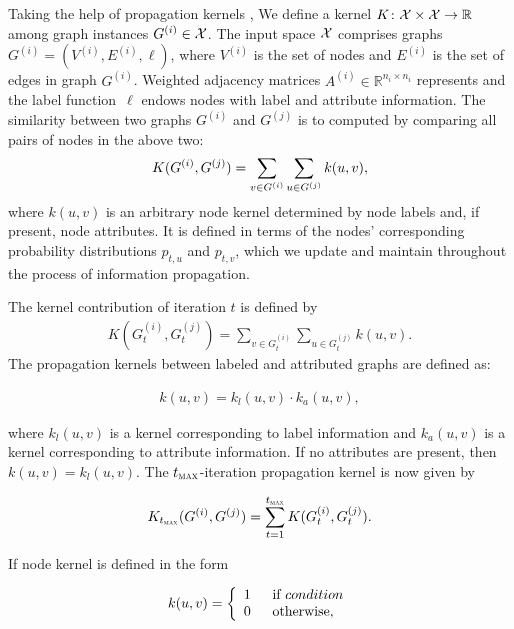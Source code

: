Taking the help of propagation kernels \citep{Neumann2015}, We define a kernel $K\colon \mathcal{X} \times \mathcal{X} \to \mathbb{R}$ 
among graph instances $G^{(i)} \in \mathcal{X} $. The input space $\mathcal{X}$ comprises graphs $G^{(i)} = (V^{(i)},E^{(i)},\ell)$, where $V^{(i)}$ is the set of nodes and $E^{(i)}$ is the set of edges in graph $G^{(i)}$. Weighted adjacency matrices $A^{(i)} \in \mathbb{R}^{n_i \times n_i}$ represents and the label function~$\ell$ endows nodes with label and attribute information.
The similarity between two graphs $G^{(i)}$ and $G^{(j)}$ is to computed by comparing all pairs of nodes in the above two:
\begin{align}
 K(G^{(i)}, G^{(j)}) =  \sum_{v \in G^{(i)}} \sum_{u \in G^{(j)}} k(u,v),  \notag
\end{align}
where $k(u,v)$ is an arbitrary node kernel determined by node labels
and, if present, node attributes. It is defined in terms of the nodes' corresponding probability distributions $p_{t,u}$ and $p_{t,v}$, which we update and maintain throughout the process of information propagation.

The kernel contribution of iteration $t$ is defined by
\begin{align}
 K(G^{(i)}_t, G^{(j)}_t) =  \sum_{v \in G^{(i)}_t} \sum_{u \in G^{(j)}_t} k(u,v).
 \label{equ:kernel_contib}
\end{align}
The propagation kernels between labeled and attributed graphs are defined as:

\begin{align}
 k(u,v) = k_l(u,v) \cdot k_a(u,v),
 \label{equ:node_kernel}
\end{align}

where $k_l(u,v)$ is a kernel corresponding to label information and
$k_a(u,v)$ is a kernel corresponding to attribute information.  If no
attributes are present, then $k(u,v) = k_l(u,v)$.  The
$t_{\textsc{max}}$-iteration propagation kernel is now given by

\begin{align}
 K_{t_{\textsc{max}}}(G^{(i)}, G^{(j)}) = \sum_{t = 1}^{t_{\textsc{max}}} K(G^{(i)}_t, G^{(j)}_t).
 \label{equ:pk_kernel}
\end{align}


If node kernel is defined in the form 

\begin{align}
  k(u,v) = \left\{
  \begin{array}{l l}
    1\;\; &  \text{if } condition\\
    0\;\; &  \text{otherwise},
  \end{array} \right.
  \label{equ:dirac_kernel}
\end{align}

